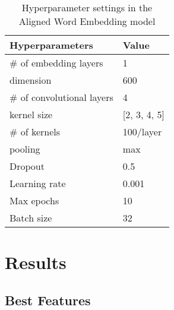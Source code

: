 \documentclass[11pt,a4paper]{article}
\begin{document}
\begin{table}[t]
  \begin{center}
  \begin{tabular}{|l|l|}
  \hline \bf Hyperparameters & \bf Value \\ \hline
  \# of embedding layers & 1 \\
  \hspace{0.5cm} dimension & 600 \\
  \# of convolutional layers & 4 \\
  \hspace{0.5cm} kernel size & [2, 3, 4, 5] \\
  \hspace{0.5cm} \# of kernels & 100/layer \\
  \hspace{0.5cm} pooling & max \\
  Dropout & 0.5 \\
  Learning rate & 0.001 \\
  Max epochs & 10 \\
  Batch size & 32 \\
  \hline
  \end{tabular}
  \end{center}
  \caption{\label{tab:cnn-hyperparams-table} Hyperparameter settings in the Aligned Word Embedding model}
\end{table}

\section{Results}\label{sec:results}

\subsection{Best Features}
\end{document}
